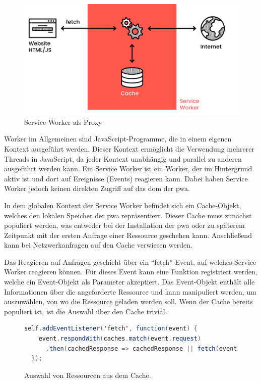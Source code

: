 \documentclass[12pt, parskip=half]{scrartcl}       %
\begin{document}
\begin{figure}
  \centering
  \includegraphics[width=1\linewidth]{src/ServiceWorker-Heise.png}
  \caption{Service Worker als Proxy\cite{src_serviceworker_heise}}
  \label{fig:heise_serviceworker}
\end{figure}

Worker im Allgemeinen sind JavaScript-Programme, die in einem eigenen Kontext ausgeführt werden.
Dieser Kontext ermöglicht die Verwendung mehrerer Threads in JavaScript, da jeder Kontext unabhängig und parallel zu anderen ausgeführt werden kann.
Ein Service Worker ist ein Worker, der im Hintergrund aktiv ist und dort auf Ereignisse (Events) reagieren kann.
Dabei haben Service Worker jedoch keinen direkten Zugriff auf das \ac{dom} der \ac{pwa}.

In dem globalen Kontext der Service Worker befindet sich ein Cache-Objekt, welches den lokalen Speicher der \ac{pwa} repräsentiert\cite{w3c_serviceworker_nightly}.
Dieser Cache muss zunächst populiert werden, was entweder bei der Installation der \ac{pwa} oder zu späterem Zeitpunkt mit der ersten Anfrage einer Ressource geschehen kann\cite{ServiceWorker_explained}.
Anschließend kann bei Netzwerkanfragen auf den Cache verwiesen werden.

Das Reagieren auf Anfragen geschieht über ein \enquote{fetch}-Event, auf welches Service Worker reagieren können.
Für dieses Event kann eine Funktion registriert werden, welche ein Event-Objekt als Parameter akzeptiert.
Das Event-Objekt enthält alle Informationen über die angeforderte Ressource und kann manipuliert werden, um auszuwählen, von wo die Ressource geladen werden soll.
Wenn der Cache bereits populiert ist, ist die Auswahl über den Cache trivial.

\begin{figure}[h]
\begin{lstlisting}[language=java]
  self.addEventListener('fetch', function(event) {
    event.respondWith(caches.match(event.request)
      .then(cachedResponse => cachedResponse || fetch(event.request)))
  });
\end{lstlisting}
\caption{Auswahl von Ressourcen aus dem Cache.\cite{heise_pwa2}}
\label{fig:js_cache}
\end{figure}
\end{document}
